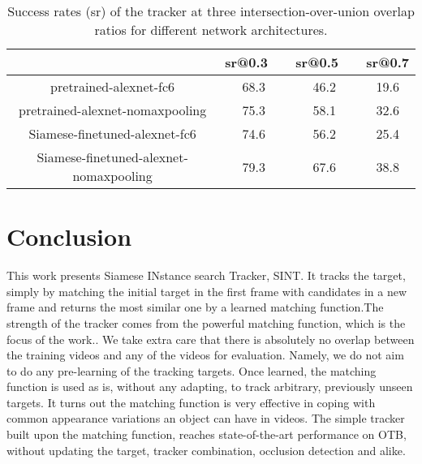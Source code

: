 \documentclass[10pt,twocolumn,letterpaper]{article}
\begin{document}
\begin{table}[h]%
	\centering 
	\caption{ Success rates (sr) of the tracker at three
		intersection-over-union overlap ratios for different network
		architectures.}\label{table2}
	\tabcolsep 0.0001in 

	\begin{tabular} {cccc}
		\hline
		&sr@0.3~~ & sr@0.5~~ &sr@0.7\\
		\hline 
		pretrained-alexnet-fc6& 68.3& 46.2 &19.6\\
		pretrained-alexnet-nomaxpooling& 75.3& 58.1 &32.6\\
		\hline 
		Siamese-finetuned-alexnet-fc6& 74.6 &56.2& 25.4\\
		Siamese-finetuned-alexnet-nomaxpooling &79.3& 67.6 &38.8\\
		\hline
	\end{tabular}
\end{table}
\section{Conclusion}
This work presents Siamese INstance search Tracker, SINT. It tracks the target, simply by matching the initial target in the first frame with candidates in a new frame and returns the most similar one by a learned matching function.The strength of the tracker comes from the powerful matching
function, which is the focus of the work.. We take extra care that there is absolutely no overlap between the training videos and any of the videos for evaluation. Namely, we do not aim to do any pre-learning of the tracking targets. Once learned, the matching function is used as is, without any adapting, to track arbitrary, previously unseen targets. It turns out the matching function is very effective in coping with common appearance variations an object can have in videos. The simple tracker built upon the matching function, reaches state-of-the-art performance on OTB, without updating the target, tracker combination, occlusion detection and alike. 
{\small

} 
\end{document}
